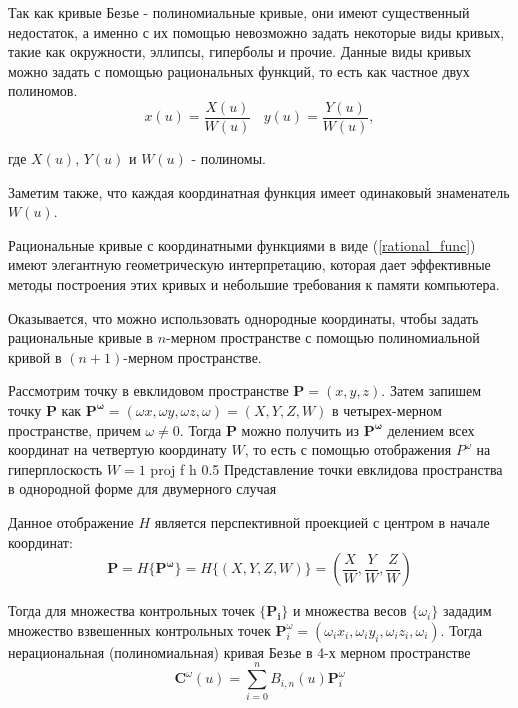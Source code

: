 \documentclass{bmstu}
\begin{document}
Так как кривые Безье - полиномиальные кривые, они имеют существенный недостаток, а именно с их помощью невозможно задать некоторые виды кривых, такие как окружности, эллипсы, гиперболы и прочие. Данные виды кривых можно задать с помощью рациональных функций, то есть как частное двух полиномов.
\begin{equation}\label{rational_func}
    x(u) = \frac{X(u)}{W(u)}~~~~y(u) = \frac{Y(u)}{W(u)},
\end{equation}

где $X(u)$, $Y(u)$ и $W(u)$ - полиномы.

Заметим также, что каждая координатная функция имеет одинаковый знаменатель $W(u)$.

Рациональные кривые с координатными функциями в виде (\ref{rational_func}) имеют элегантную геометрическую интерпретацию, которая дает эффективные методы построения этих кривых и небольшие требования к памяти компьютера.

Оказывается, что можно использовать однородные координаты, чтобы задать рациональные кривые в $n$-мерном пространстве с помощью полиномиальной кривой в $(n+1)$-мерном пространстве.

Рассмотрим точку в евклидовом пространстве $\mathbf{P} = (x,y,z)$. Затем запишем точку $\mathbf{P}$ как $\mathbf{P^\omega}=(\omega x, \omega y, \omega z, \omega)=(X, Y, Z, W)$ в четырех-мерном пространстве, причем $\omega \neq 0$. Тогда $\mathbf{P}$ можно получить из $\mathbf{P^\omega}$ делением всех координат на четвертую координату $W$, то есть с помощью отображения $P^\omega$ на гиперплоскость $W=1$
{proj} %
{f} %
{h} %
{0.5\textwidth} %
{Представление точки евклидова пространства в однородной форме для двумерного случая} %

Данное отображение $H$ является перспективной проекцией с центром в начале координат:
\begin{equation}\label{projfunc}
    \mathbf{P} = H\{\mathbf{P^\omega}\} = H\{(X, Y, Z, W)\} =
    \left(\frac{X}{W}, \frac{Y}{W}, \frac{Z}{W}\right)
\end{equation}

Тогда для множества контрольных точек $\{\mathbf{P_i}\}$ и множества весов $\{\omega_i\}$ зададим множество взвешенных контрольных точек $\mathbf{P}_i^\omega=(\omega_ix_i,\omega_iy_i,\omega_iz_i, \omega_i)$. Тогда нерациональная (полиномиальная) кривая Безье в 4-х мерном пространстве
\begin{equation}\label{4bez}
    \mathbf{C}^\omega(u) = \sum\limits_{i=0}^nB_{i,n}(u)\mathbf{P}_i^\omega
\end{equation}
\end{document}
